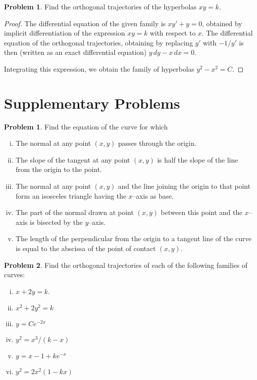\documentclass{scrartcl}
\theoremstyle{definition}
\newtheorem{problem}{Problem}
\newtheorem*{problem*}{Problem}
\begin{document}
\begin{problem*}
Find the orthogonal trajectories of the hyperbolas $xy=k$.
\end{problem*}
\begin{proof}
The differential equation of the given family is $xy'+y=0$, obtained by implicit differentiation of the expression $xy=k$ with respect to $x$.  The differential equation of the orthogonal trajectories, obtaining by replacing $y'$ with $-1/y'$ is then (written as an exact differential equation) $y\, dy - x\, dx = 0$.

Integrating this expression, we obtain the family of hyperbolas $y^2-x^2=C$.
\end{proof}

\section*{Supplementary Problems}
\begin{problem}
Find the equation of the curve for which
\begin{enumerate}[(i)]
	\item The normal at any point $(x,y)$ passes through the origin.
	\item The slope of the tangent at any point $(x,y)$ is half the slope of the line from the origin to the point.
	\item The normal at any point $(x,y)$ and the line joining the origin to that point form an isosceles triangle having the $x$--axis as base.
	\item The part of the normal drawn at point $(x,y)$ between this point and the $x$--axis is bisected by the $y$--axis.
	\item The length of the perpendicular from the origin to a tangent line of the curve is equal to the abscissa of the point of contact $(x,y)$.
\end{enumerate}
\end{problem}

\begin{problem}
Find the orthogonal trajectories of each of the following families of curves:
\begin{multicols}{2}
\begin{enumerate}[(i)]
	\item $x+2y=k$.
	\item $x^2+2y^2=k$
	\item $y=Ce^{-2x}$
	\item $y^2 = x^3/(k-x)$
	\item $y=x-1+ke^{-x}$
	\item $y^2 = 2x^2(1-kx)$
\end{enumerate}
\end{multicols}
\end{problem}
\end{document}
